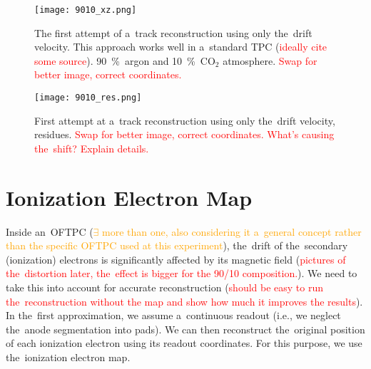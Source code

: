 		\begin{figure}[H]
			\centering
			\texttt{[image: 9010\_xz.png]}
			\caption{The first attempt of a~track reconstruction using only the~drift velocity. This approach works well in a~standard \ac{TPC} (\textcolor{red}{ideally cite some source}). 90~\%~argon and 10~\%~CO$_2$ atmosphere. \textcolor{red}{Swap for better image, correct coordinates.}}
			\label{fig:9010xz}
		\end{figure}
		
		\begin{figure}[H]
			\centering
			\texttt{[image: 9010\_res.png]}
			\caption{First attempt at a~track reconstruction using only the~drift velocity, residues. \textcolor{red}{Swap for better image, correct coordinates. What's causing the~shift? Explain details.}}
			\label{fig:9010res}
		\end{figure}
	
	\section{Ionization Electron Map}
	\label{sec:map}
		Inside an~\ac{OFTPC} (\textcolor{orange}{$\exists$ more than one, also considering it a~general concept rather than the specific OFTPC used at this experiment}), the~drift of the~secondary (ionization) electrons is significantly affected by its magnetic field (\textcolor{red}{pictures of the~distortion later, the~effect is bigger for the 90/10 composition.}). We need to take this into account for accurate reconstruction (\textcolor{red}{should be easy to run the~reconstruction without the map and show how much it improves the results}). In the~first approximation, we assume a~continuous readout (i.e., we neglect the~anode segmentation into pads). We can then reconstruct the~original position of each ionization electron using its readout coordinates. For this purpose, we use the~ionization electron map.
		
